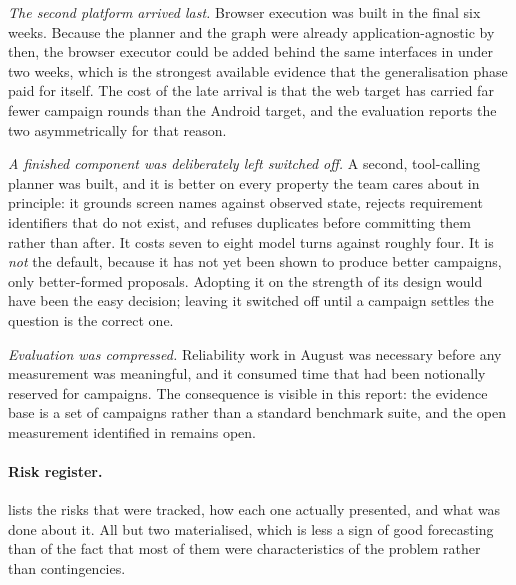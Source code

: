 \emph{The second platform arrived last.} Browser execution was built in the
final six weeks. Because the planner and the graph were already
application-agnostic by then, the browser executor could be added behind the
same interfaces in under two weeks, which is the strongest available evidence
that the generalisation phase paid for itself. The cost of the late arrival is
that the web target has carried far fewer campaign rounds than the Android
target, and the evaluation reports the two asymmetrically for that reason.

\emph{A finished component was deliberately left switched off.} A second,
tool-calling planner was built, and it is better on every property the team
cares about in principle: it grounds screen names against observed state,
rejects requirement identifiers that do not exist, and refuses duplicates
before committing them rather than after. It costs seven to eight model turns
against roughly four. It is \emph{not} the default, because it has not yet been
shown to produce better campaigns, only better-formed proposals. Adopting it on
the strength of its design would have been the easy decision; leaving it
switched off until a campaign settles the question is the correct one.

\emph{Evaluation was compressed.} Reliability work in August was necessary
before any measurement was meaningful, and it consumed time that had been
notionally reserved for campaigns. The consequence is visible in this report:
the evidence base is a set of campaigns rather than a standard benchmark suite,
and the open measurement identified in  remains open.

\paragraph{Risk register.}  lists the risks that were tracked,
how each one actually presented, and what was done about it. All but two
materialised, which is less a sign of good forecasting than of the fact that
most of them were characteristics of the problem rather than contingencies.

